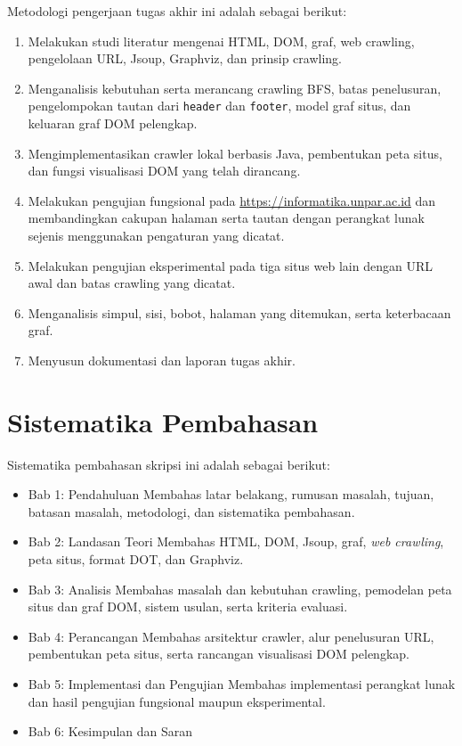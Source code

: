 Metodologi pengerjaan tugas akhir ini adalah sebagai berikut:
\begin{enumerate}
    \item Melakukan studi literatur mengenai HTML, DOM, graf, web crawling, pengelolaan URL, Jsoup, Graphviz, dan prinsip crawling.
    \item Menganalisis kebutuhan serta merancang crawling BFS, batas penelusuran, pengelompokan tautan dari \texttt{header} dan \texttt{footer}, model graf situs, dan keluaran graf DOM pelengkap.
    \item Mengimplementasikan crawler lokal berbasis Java, pembentukan peta situs, dan fungsi visualisasi DOM yang telah dirancang.
    \item Melakukan pengujian fungsional pada \url{https://informatika.unpar.ac.id} dan membandingkan cakupan halaman serta tautan dengan perangkat lunak sejenis menggunakan pengaturan yang dicatat.
    \item Melakukan pengujian eksperimental pada tiga situs web lain dengan URL awal dan batas crawling yang dicatat.
    \item Menganalisis simpul, sisi, bobot, halaman yang ditemukan, serta keterbacaan graf.
    \item Menyusun dokumentasi dan laporan tugas akhir.
\end{enumerate}

\section{Sistematika Pembahasan}
\label{sec:1:sispem}

Sistematika pembahasan skripsi ini adalah sebagai berikut:
\begin{itemize}
    \item Bab 1: Pendahuluan
          Membahas latar belakang, rumusan masalah, tujuan, batasan masalah, metodologi, dan sistematika pembahasan.
    \item Bab 2: Landasan Teori
    Membahas HTML, DOM, Jsoup, graf, \textit{web crawling}, peta situs, format DOT, dan Graphviz.
    \item Bab 3: Analisis
    Membahas masalah dan kebutuhan crawling, pemodelan peta situs dan graf DOM, sistem usulan, serta kriteria evaluasi.
    \item Bab 4: Perancangan
          Membahas arsitektur crawler, alur penelusuran URL, pembentukan peta situs, serta rancangan visualisasi DOM pelengkap.
    \item Bab 5: Implementasi dan Pengujian
          Membahas implementasi perangkat lunak dan hasil pengujian fungsional maupun eksperimental.
    \item Bab 6: Kesimpulan dan Saran
\end{itemize}
